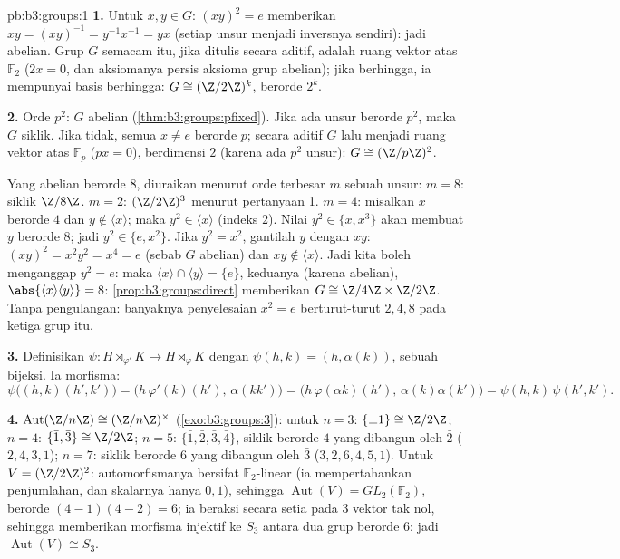 \begin{solution}{pb:b3:groups:1}
\textbf{1.} Untuk $x, y \in G$: $(xy)^2 = e$ memberikan $xy = (xy)^{-1} =
y^{-1}x^{-1} = yx$ (setiap unsur menjadi inversnya sendiri): jadi abelian.
Grup $G$ semacam itu, jika ditulis secara aditif, adalah ruang vektor atas $\mathbb
F_2$ ($2x = 0$, dan aksiomanya persis aksioma grup abelian); jika
berhingga, ia mempunyai basis berhingga: $G \cong (\Z/2\Z)^k$, berorde
$2^k$.

\textbf{2.} Orde $p^2$: $G$ abelian
(\cref{thm:b3:groups:pfixed}). Jika ada unsur berorde $p^2$, maka
$G$ siklik. Jika tidak, semua $x \neq e$ berorde $p$; secara aditif
$G$ lalu menjadi ruang vektor atas $\mathbb F_p$ ($px = 0$), berdimensi
$2$ (karena ada $p^2$ unsur): $G \cong (\Z/p\Z)^2$.

Yang abelian berorde $8$, diuraikan menurut orde terbesar $m$ sebuah unsur: $m =
8$: siklik $\Z/8\Z$. $m = 2$: $(\Z/2\Z)^3$ menurut pertanyaan 1. $m = 4$:
misalkan $x$ berorde $4$ dan $y \notin \langle x \rangle$; maka $y^2 \in
\langle x\rangle$ (indeks $2$). Nilai $y^2 \in \{x, x^3\}$ akan membuat $y$
berorde $8$; jadi $y^2 \in \{e, x^2\}$. Jika $y^2 = x^2$, gantilah $y$ dengan
$xy$: $(xy)^2 = x^2y^2 = x^4 = e$ (sebab $G$ abelian) dan $xy \notin
\langle x\rangle$. Jadi kita boleh menganggap $y^2 = e$: maka $\langle x
\rangle \cap \langle y \rangle = \{e\}$, keduanya  (karena abelian),
$\abs{\langle x\rangle \langle y\rangle} = 8$:
\cref{prop:b3:groups:direct} memberikan $G \cong \Z/4\Z \times \Z/2\Z$.
Tanpa pengulangan: banyaknya penyelesaian $x^2 = e$ berturut-turut $2, 4, 8$
pada ketiga grup itu.

\textbf{3.} Definisikan $\psi \colon H \rtimes_{\varphi'} K \to H
\rtimes_{\varphi} K$ dengan $\psi(h, k) = (h, \alpha(k))$, sebuah bijeksi.
Ia morfisma:
\[
\psi\bigl((h,k)(h',k')\bigr)
= \bigl(h\,\varphi'(k)(h'),\, \alpha(kk')\bigr)
= \bigl(h\,\varphi(\alpha k)(h'),\, \alpha(k)\alpha(k')\bigr)
= \psi(h,k)\,\psi(h',k').
\]

\textbf{4.} $\operatorname{Aut}(\Z/n\Z) \cong (\Z/n\Z)^\times$
(\cref{exo:b3:groups:3}): untuk $n = 3$: $\{\pm 1\} \cong \Z/2\Z$;
$n = 4$: $\{\bar 1, \bar 3\} \cong \Z/2\Z$; $n = 5$: $\{\bar 1,
\bar 2, \bar 3, \bar 4\}$, siklik berorde $4$ yang dibangun oleh $\bar
2$ ($2, 4, 3, 1$); $n = 7$: siklik berorde $6$ yang dibangun oleh $\bar
3$ ($3, 2, 6, 4, 5, 1$). Untuk $V = (\Z/2\Z)^2$: automorfismanya bersifat
$\mathbb F_2$-linear (ia mempertahankan penjumlahan, dan skalarnya hanya $0,
1$), sehingga $\operatorname{Aut}(V) = GL_2(\mathbb F_2)$, berorde
$(4-1)(4-2) = 6$; ia beraksi secara setia pada $3$ vektor tak nol,
sehingga memberikan morfisma injektif ke $S_3$ antara dua grup berorde
$6$: jadi $\operatorname{Aut}(V) \cong S_3$.


\end{solution}
